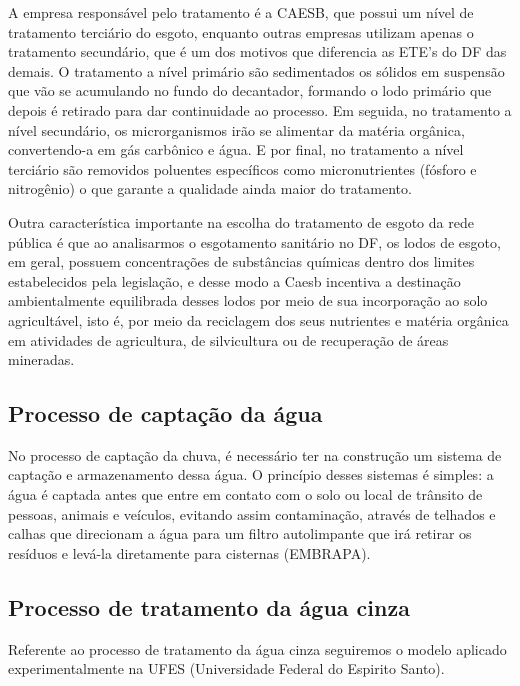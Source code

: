 	A empresa responsável pelo tratamento é a CAESB, que possui um nível de tratamento terciário do esgoto, enquanto outras empresas utilizam apenas o tratamento secundário, que é um dos motivos que diferencia as ETE's do DF das demais. O tratamento a nível primário são sedimentados os sólidos em suspensão que vão se acumulando no fundo do decantador, formando o lodo primário que depois é retirado para dar continuidade ao processo. Em seguida, no tratamento a nível secundário, os microrganismos irão se alimentar da matéria orgânica, convertendo-a em gás carbônico e água. E por final, no tratamento a nível terciário são removidos poluentes específicos como micronutrientes (fósforo e nitrogênio) o que garante a qualidade ainda maior do tratamento.

	Outra característica importante na escolha do tratamento de esgoto da rede pública é que ao analisarmos o esgotamento sanitário no DF, os lodos de esgoto, em geral, possuem concentrações de substâncias químicas dentro dos limites estabelecidos pela legislação, e desse modo a Caesb incentiva a destinação ambientalmente equilibrada desses lodos por meio de sua incorporação ao solo agricultável, isto é, por meio da reciclagem dos seus nutrientes e matéria orgânica em atividades de agricultura, de silvicultura ou de recuperação de áreas mineradas.

\subsection{Processo de captação da água}

	No processo de captação da chuva, é necessário ter na construção um sistema de captação e armazenamento dessa água. O princípio desses sistemas é simples: a água é captada antes que entre em contato com o solo ou local de trânsito de pessoas, animais e veículos, evitando assim contaminação, através de telhados e calhas que direcionam a água para um filtro autolimpante que irá retirar os resíduos e levá-la diretamente para cisternas (EMBRAPA).


\subsection{Processo de tratamento da água cinza}

	Referente ao processo de tratamento da água cinza seguiremos o modelo aplicado experimentalmente na UFES (Universidade Federal do Espirito Santo). 

